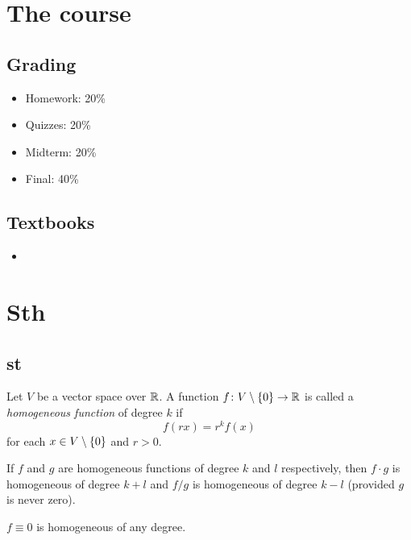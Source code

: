 \chapter*{The course} \label{chp:course}

\section*{Grading} \label{sec:grading}
\begin{itemize}
    \item Homework: 20\%
    \item Quizzes: 20\%
    \item Midterm: 20\%
    \item Final: 40\%
\end{itemize}

\section*{Textbooks} \label{sec:books}
\begin{itemize}
    \item 
\end{itemize}

\chapter{Sth}

\section{st}

\begin{definition} \label{def:home}
    Let $V$ be a vector space over $\mathbb{R}$.
    A function $f\colon V \setminus \{0\} \to \mathbb{R}$ is called
    a \emph{homogeneous function} of degree $k$ if \[
        f(r x) = r^k f(x)
    \] for each $x \in V \setminus \{0\}$ and $r > 0$.
\end{definition}
\begin{remarks}
    \item If $f$ and $g$ are homogeneous functions of degree $k$ and $l$
    respectively, then $f \cdot g$ is homogeneous of degree $k + l$
    and $f / g$ is homogeneous of degree $k - l$
    (provided $g$ is never zero).
    \item $f \equiv 0$ is homogeneous of any degree.
\end{remarks}

